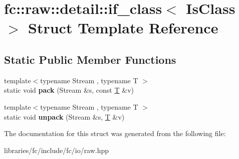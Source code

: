 \hypertarget{structfc_1_1raw_1_1detail_1_1if__class}{}\section{fc\+:\+:raw\+:\+:detail\+:\+:if\+\_\+class$<$ Is\+Class $>$ Struct Template Reference}
\label{structfc_1_1raw_1_1detail_1_1if__class}
\subsection*{Static Public Member Functions}
\begin{DoxyCompactItemize}
\item 
\mbox{\label{structfc_1_1raw_1_1detail_1_1if__class_ab07a988d1aa3386e2e58a8e099e2daff}} 
{\footnotesize template$<$typename Stream , typename T $>$ }\\static void {\bfseries pack} (Stream \&s, const \mbox{\hyperlink{struct_t}{T}} \&v)
\item 
\mbox{\label{structfc_1_1raw_1_1detail_1_1if__class_a3d86956dac9c97262f1406f16710172f}} 
{\footnotesize template$<$typename Stream , typename T $>$ }\\static void {\bfseries unpack} (Stream \&s, \mbox{\hyperlink{struct_t}{T}} \&v)
\end{DoxyCompactItemize}


The documentation for this struct was generated from the following file\+:\begin{DoxyCompactItemize}
\item 
libraries/fc/include/fc/io/raw.\+hpp\end{DoxyCompactItemize}
